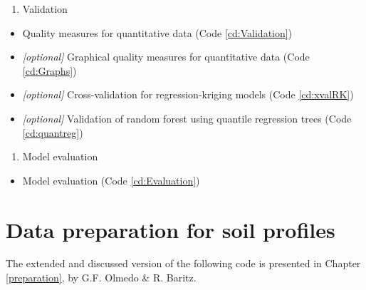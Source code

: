 \documentclass[10pt,b5paper,]{book}
\providecommand{\tightlist}{%
  \setlength{\itemsep}{0pt}\setlength{\parskip}{0pt}}
\theoremstyle{definition}
\theoremstyle{definition}
\theoremstyle{definition}
\theoremstyle{remark}
\begin{document}
\begin{enumerate}
\def\labelenumi{\arabic{enumi}.}
\setcounter{enumi}{3}
\tightlist
\item
  Validation
\end{enumerate}

\begin{itemize}
\tightlist
\item
  Quality measures for quantitative data (Code \ref{cd:Validation})
\item
  \emph{{[}optional{]}} Graphical quality measures for quantitative data
  (Code \ref{cd:Graphs})
\item
  \emph{{[}optional{]}} Cross-validation for regression-kriging models
  (Code \ref{cd:xvalRK})
\item
  \emph{{[}optional{]}} Validation of random forest using quantile
  regression trees (Code \ref{cd:quantreg})
\end{itemize}

\begin{enumerate}
\def\labelenumi{\arabic{enumi}.}
\setcounter{enumi}{4}
\tightlist
\item
  Model evaluation
\end{enumerate}

\begin{itemize}
\tightlist
\item
  Model evaluation (Code \ref{cd:Evaluation})
\end{itemize}

\clearpage

\hypertarget{cd:PreparationProfiles}{%
\section{Data preparation for soil
profiles}\label{cd:PreparationProfiles}}

The extended and discussed version of the following code is presented in
Chapter \ref{preparation}, by G.F. Olmedo \& R. Baritz.
\end{document}
